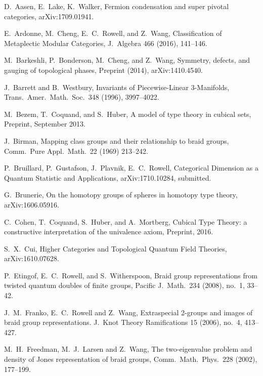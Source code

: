 \documentclass[12pt]{article}
\theoremstyle{plain} \numberwithin{equation}{section}
\theoremstyle{definition}
\begin{document}
\begin{thebibliography}{0}

   D.\ Aasen, E.\ Lake, K.\ Walker, Fermion condensation and super pivotal categories, arXiv:1709.01941.
  
   E.\ Ardonne, M.\ Cheng, E.\ C.\ Rowell, and Z.\ Wang, {Classification of Metaplectic Modular Categories}, J.\ Algebra {466} (2016), 141--146.

   M.\ Barkeshli, P.\ Bonderson, M.\ Cheng, and Z.\ Wang, {Symmetry, defects, and gauging of topological phases}, Preprint (2014), arXiv:1410.4540.
  
   J.\ Barrett and B.\ Westbury, {Invariants
    of Piecewise-Linear 3-Manifolds}, Trans.\ Amer.\ Math.\ Soc.\ {348} (1996), 3997--4022.

   M.\ Bezem, T.\ Coquand, and S.\ Huber, A model of type theory in cubical sets, Preprint, September 2013.

   J.\ Birman, {Mapping class groups and their relationship to braid groups}, Comm.\ Pure Appl.\ Math.\ {22} (1969) 213--242.


     P.\ Bruillard, P.\ Gustafson, J.\ Plavnik, E.\ C.\ Rowell, Categorical Dimension as a Quantum Statistic and Applications, arXiv:1710.10284, submitted.
    
   G.\ Brunerie, On the homotopy groups of spheres in homotopy type theory, arXiv:1606.05916.
    
   C.\ Cohen, T.\ Coquand, S.\ Huber, and A.\ Mortberg, Cubical Type Theory: a constructive interpretation of the univalence axiom, Preprint, 2016.

   S.\ X.\ Cui, Higher Categories and Topological Quantum Field Theories, arXiv:1610.07628.
    
   P.\ Etingof, E.\ C.\ Rowell, and S.\ Witherspoon, {Braid group representations from twisted quantum doubles of finite groups}, Pacific J.\ Math.\ {234} (2008), no.\ 1, 33--42.

     J.\ M.\ Franko, E.\ C.\ Rowell and Z.\ Wang, {Extraspecial 2-groups and images of braid group representations.}  J.\ Knot Theory Ramifications {15} (2006),  no.\ 4, 413--427.
    
          M.\ H.\ Freedman, M.\ J.\ Larsen and Z.\ Wang, {The two-eigenvalue problem and density of Jones representation of braid groups}, Comm.\ Math.\ Phys.\ {228} (2002), 177--199.


\end{thebibliography}
\end{document}
